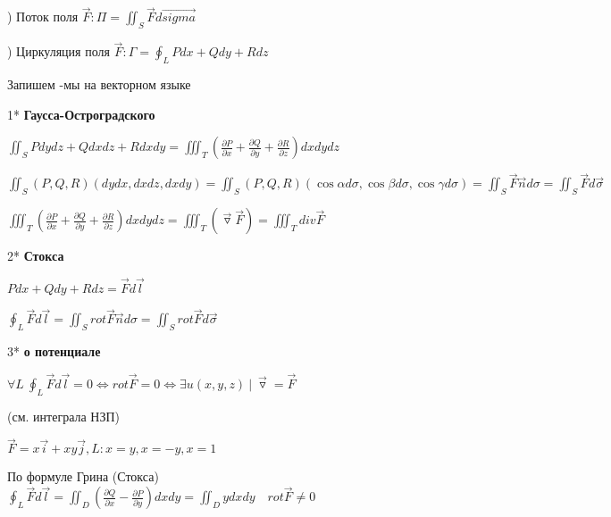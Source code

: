 \documentclass[12pt]{article}
\begin{document}
    ) Поток поля $\overrightarrow{F}: \Pi = \iint_S \overrightarrow{F}d\overrightarrow{sigma}$

    ) Циркуляция поля $\overrightarrow{F}: \Gamma = \oint_L Pdx + Qdy + Rdz$

    \Nota Запишем \Ths-мы на векторном языке

    1* \textbf{Гаусса-Остроградского}

    $\iint_S Pdydz + Qdxdz + Rdxdy = \iiint_T (\frac{\partial P}{\partial x} + \frac{\partial Q}{\partial y} + \frac{\partial R}{\partial z}) dxdydz$

    $\iint_S (P, Q, R) (dydx, dxdz, dxdy) = \iint_S (P, Q, R) (\cos\alpha d\sigma, \cos\beta d\sigma, \cos\gamma d\sigma) =
    \iint_S \overrightarrow{F} \overrightarrow{n} d\sigma = \iint_S \overrightarrow{F} d\overrightarrow{\sigma}$

    $\iiint_T (\frac{\partial P}{\partial x} + \frac{\partial Q}{\partial y} + \frac{\partial R}{\partial z}) dxdydz = \iiint_T (\overrightarrow{\triangledown} \overrightarrow{F}) = \iiint_T div \overrightarrow{F}$


    \vspace{5mm}

    2* \textbf{Стокса}

    $Pdx + Qdy + Rdz = \overrightarrow{F}d\overrightarrow{l}$

    $\oint_L \overrightarrow{F}d\overrightarrow{l} = \iint_S rot \overrightarrow{F} \overrightarrow{n} d\sigma = \iint_S rot \overrightarrow{F} d\overrightarrow{\sigma}$

    \vspace{5mm}

    3* \textbf{\Th о потенциале}

    $\forall L \ \oint_L \overrightarrow{F}d\overrightarrow{l} = 0 \Longleftrightarrow rot \overrightarrow{F} = 0 \Longleftrightarrow \exists u(x, y, z) \ | \ \overrightarrow{\triangledown} = \overrightarrow{F}$

    (см. \Ths интеграла НЗП)

    \Ex $\overrightarrow{F} = x\overrightarrow{i} + xy \overrightarrow{j}, L: x = y, x = -y, x = 1$

    По формуле Грина (Стокса) $\oint_L \overrightarrow{F} d\overrightarrow{l} = \iint_{D} (\frac{\partial Q}{\partial x} - \frac{\partial P}{\partial y}) dxdy =
    \iint_D y dxdy \quad rot \overrightarrow{F} \neq 0$
\end{document}
